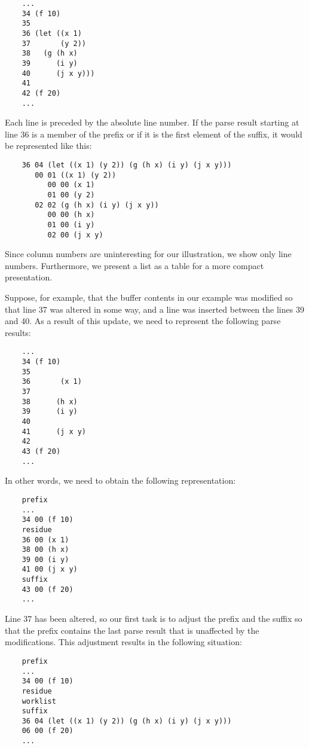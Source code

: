 {\small\begin{verbatim}
    ...
    34 (f 10)
    35
    36 (let ((x 1)
    37       (y 2))
    38   (g (h x)
    39      (i y)
    40      (j x y)))
    41
    42 (f 20)
    ...
\end{verbatim}}

Each line is preceded by the absolute line number.  If the parse
result starting at line 36 is a member of the prefix or if it is the
first element of the suffix, it would be represented like this:

{\small\begin{verbatim}
    36 04 (let ((x 1) (y 2)) (g (h x) (i y) (j x y)))
       00 01 ((x 1) (y 2))
          00 00 (x 1)
          01 00 (y 2)
       02 02 (g (h x) (i y) (j x y))
          00 00 (h x)
          01 00 (i y)
          02 00 (j x y)
\end{verbatim}}

Since column numbers are uninteresting for our illustration, we
show only line numbers.  Furthermore, we present a list as a table for
a more compact presentation.

Suppose, for example, that the buffer contents in our example was
modified so that line 37 was altered in some way, and a line was
inserted between the lines 39 and 40.  As a result of this update, we
need to represent the following parse results:

{\small\begin{verbatim}
    ...
    34 (f 10)
    35
    36       (x 1)
    37
    38      (h x)
    39      (i y)
    40
    41      (j x y)
    42
    43 (f 20)
    ...
\end{verbatim}}

In other words, we need to obtain the following representation:

{\small\begin{verbatim}
    prefix
    ...
    34 00 (f 10)
    residue
    36 00 (x 1)
    38 00 (h x)
    39 00 (i y)
    41 00 (j x y)
    suffix
    43 00 (f 20)
    ...
\end{verbatim}}

Line 37 has been altered, so our first task is to adjust the prefix
and the suffix so that the prefix contains the last parse result that
is unaffected by the modifications.  This adjustment results in the
following situation:

{\small\begin{verbatim}
    prefix
    ...
    34 00 (f 10)
    residue
    worklist
    suffix
    36 04 (let ((x 1) (y 2)) (g (h x) (i y) (j x y)))
    06 00 (f 20)
    ...
\end{verbatim}}

